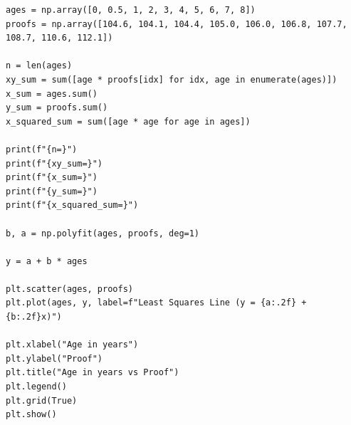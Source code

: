 \documentclass{article}
\begin{document}
{\begin{verbatim}
ages = np.array([0, 0.5, 1, 2, 3, 4, 5, 6, 7, 8])
proofs = np.array([104.6, 104.1, 104.4, 105.0, 106.0, 106.8, 107.7, 108.7, 110.6, 112.1])

n = len(ages)
xy_sum = sum([age * proofs[idx] for idx, age in enumerate(ages)])
x_sum = ages.sum()
y_sum = proofs.sum()
x_squared_sum = sum([age * age for age in ages])

print(f"{n=}")
print(f"{xy_sum=}")
print(f"{x_sum=}")
print(f"{y_sum=}")
print(f"{x_squared_sum=}")

b, a = np.polyfit(ages, proofs, deg=1)

y = a + b * ages 

plt.scatter(ages, proofs)
plt.plot(ages, y, label=f"Least Squares Line (y = {a:.2f} + {b:.2f}x)")

plt.xlabel("Age in years")
plt.ylabel("Proof")
plt.title("Age in years vs Proof")
plt.legend()
plt.grid(True)
plt.show()
\end{verbatim}

}
\end{document}
